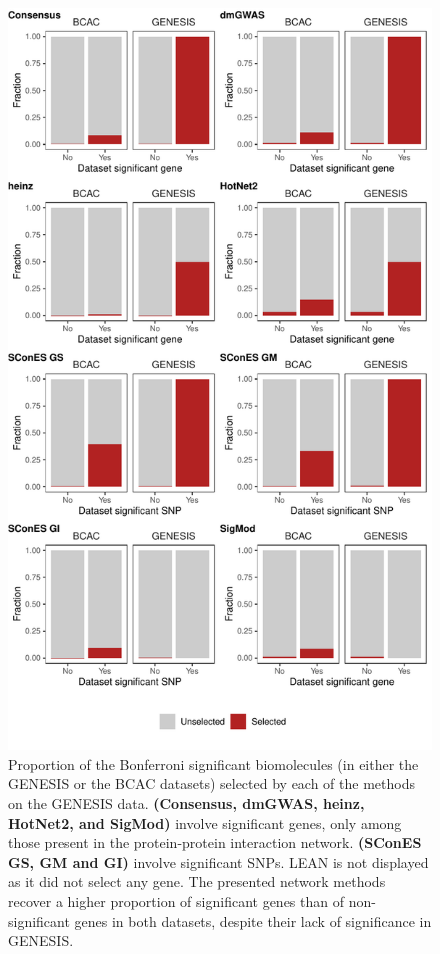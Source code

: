 \documentclass[twocolumn, 10pt]{article}
\begin{document}
\begin{figure}[htbp]
\centering
\includegraphics[width=\textwidth,height=\textheight,keepaspectratio]{./figures/sfigure_4.pdf}
\caption{\label{sfig:bcac_comparison}
Proportion of the Bonferroni significant biomolecules (in either the GENESIS or the BCAC datasets) selected by each of the methods on the GENESIS data. \textbf{(Consensus, dmGWAS, heinz, HotNet2, and SigMod)} involve significant genes, only among those present in the protein-protein interaction network. \textbf{(SConES GS, GM and GI)} involve significant SNPs. LEAN is not displayed as it did not select any gene. The presented network methods recover a higher proportion of significant genes than of non-significant genes in both datasets, despite their lack of significance in GENESIS.}
\end{figure}
\end{document}

